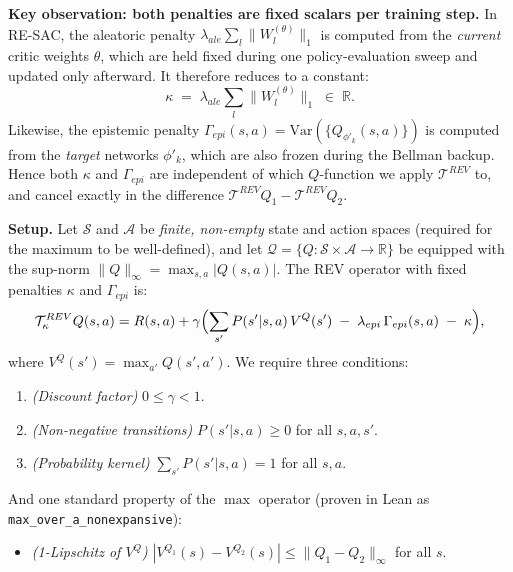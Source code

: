 \medskip
\noindent\textbf{Key observation: both penalties are fixed scalars per training step.}
In RE-SAC, the aleatoric penalty $\lambda_{ale} \sum_l \|W_l^{(\theta)}\|_1$ is computed from the \emph{current} critic weights $\theta$, which are held fixed during one policy-evaluation sweep and updated only afterward. It therefore reduces to a constant:
\begin{equation}
    \kappa \;=\; \lambda_{ale} \textstyle\sum_l \|W_l^{(\theta)}\|_1 \;\in\; \mathbb{R}.
\end{equation}
Likewise, the epistemic penalty $\Gamma_{epi}(s,a) = \text{Var}(\{Q_{\phi'_k}(s,a)\})$ is computed from the \emph{target} networks $\phi'_k$, which are also frozen during the Bellman backup. Hence both $\kappa$ and $\Gamma_{epi}$ are independent of which $Q$-function we apply $\mathcal{T}^{REV}$ to, and cancel exactly in the difference $\mathcal{T}^{REV} Q_1 - \mathcal{T}^{REV} Q_2$.

\medskip
\noindent\textbf{Setup.}
Let $\mathcal{S}$ and $\mathcal{A}$ be \emph{finite, non-empty} state and action spaces (required for the maximum to be well-defined), and let $\mathcal{Q} = \{Q : \mathcal{S} \times \mathcal{A} \to \mathbb{R}\}$ be equipped with the sup-norm $\|Q\|_\infty = \max_{s,a} |Q(s,a)|$.
The REV operator with fixed penalties $\kappa$ and $\Gamma_{epi}$ is:
\begin{equation}
    \mathcal{T}^{REV}_\kappa Q(s,a) = R(s,a) + \gamma \Bigl(
        \sum_{s'} P(s'|s,a)\,V^Q(s') \;-\;
        \lambda_{epi}\,\Gamma_{epi}(s,a) \;-\;
        \kappa
    \Bigr),
\end{equation}
where $V^Q(s') = \max_{a'} Q(s', a')$.  We require three conditions:

\begin{enumerate}
    \item[\textbf{(A0)}] \textit{(Discount factor)} $0 \le \gamma < 1$.
    \item[\textbf{(A1)}] \textit{(Non-negative transitions)} $P(s'|s,a) \ge 0$ for all $s,a,s'$.
    \item[\textbf{(A2)}] \textit{(Probability kernel)} $\sum_{s'} P(s'|s,a) = 1$ for all $s,a$.
\end{enumerate}

And one standard property of the $\max$ operator (proven in Lean as \texttt{max\_over\_a\_nonexpansive}):

\begin{itemize}
    \item[\textbf{(P)}] \textit{(1-Lipschitz of $V^Q$)} $|V^{Q_1}(s) - V^{Q_2}(s)| \le \|Q_1 - Q_2\|_\infty$ for all $s$.
\end{itemize}

